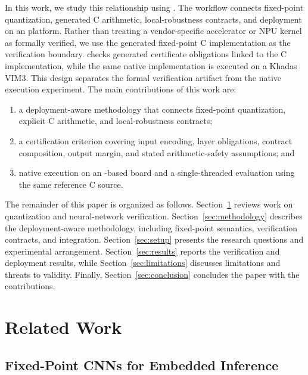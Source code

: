 In this work, we study this relationship using \PreQBMC{}. The workflow connects fixed-point quantization, generated C arithmetic, local-robustness contracts, and deployment on an \AAOS{} platform. Rather than treating a vendor-specific accelerator or NPU kernel as formally verified, we use the generated fixed-point C implementation as the verification boundary. \ESBMC{} checks generated certificate obligations linked to the C implementation, while the same native implementation is executed on a Khadas VIM3. This design separates the formal verification artifact from the native execution experiment. The main contributions of this work are:

\begin{enumerate}[leftmargin=*,nosep]
  \item a deployment-aware methodology that connects fixed-point quantization, explicit C arithmetic, and local-robustness contracts;
  \item a certification criterion covering input encoding, layer obligations, contract composition, output margin, and stated arithmetic-safety assumptions; and
  \item native execution on an \AAOS{}-based board and a single-threaded \Aseven{} evaluation using the same reference C source.
\end{enumerate}

The remainder of this paper is organized as follows. Section~\ref{sec:related} reviews work on quantization and neural-network verification. Section~\ref{sec:methodology} describes the deployment-aware methodology, including fixed-point semantics, verification contracts, and \AAOS{} integration. Section~\ref{sec:setup} presents the research questions and experimental arrangement. Section~\ref{sec:results} reports the verification and deployment results, while Section~\ref{sec:limitations} discusses limitations and threats to validity. Finally, Section~\ref{sec:conclusion} concludes the paper with the contributions.


\section{Related Work}
\label{sec:related}

\subsection{Fixed-Point CNNs for Embedded Inference}



